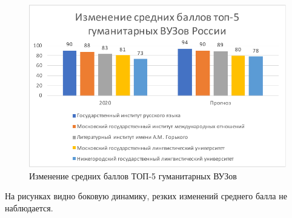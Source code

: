\begin{figure}[hbtp]
	\centering
	\includegraphics[scale=1.1]{img/top5gym.pdf.pdf}
	\caption{Изменение средних баллов ТОП-5 гуманитарных ВУЗов}
	\label{top5tech}
\end{figure} 	

На рисунках видно боковую динамику, резких изменений среднего балла не наблюдается.

\pagebreak